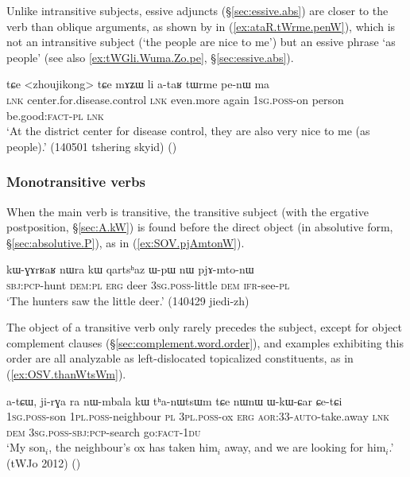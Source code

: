 Unlike intransitive subjects, essive adjuncts (§\ref{sec:essive.abs}) are closer to the verb than oblique arguments, as shown by  in (\ref{ex:ataR.tWrme.penW}), which is not an intransitive subject (`the people are nice to me') but an essive phrase `as people' (see also \ref{ex:tWGli.Wuma.Zo.pe}, §\ref{sec:essive.abs}).

\begin{exe}
\ex \label{ex:ataR.tWrme.penW}
\gll tɕe <zhoujikong> tɕe mɤʑɯ li a-taʁ tɯrme pe-nɯ ma \\
\textsc{lnk} center.for.disease.control \textsc{lnk} even.more again \textsc{1sg}.\textsc{poss}-on person be.good:\textsc{fact}-\textsc{pl} \textsc{lnk} \\
\glt `At the district center for disease control, they are also very nice to me (as people).' (140501 tshering skyid)
()
\end{exe}

 
\subsubsection{Monotransitive verbs} \label{sec:monotransitive.word.order}
When the main verb is transitive, the transitive subject (with the ergative postposition, §\ref{sec:A.kW}) is found before the direct object (in absolutive form, §\ref{sec:absolutive.P}), as in (\ref{ex:SOV.pjAmtonW}). 

\begin{exe}
\ex \label{ex:SOV.pjAmtonW}
\gll kɯ-ɣɤrʁaʁ nɯra kɯ qartsʰaz ɯ-pɯ nɯ pjɤ-mto-nɯ \\
\textsc{sbj}:\textsc{pcp}-hunt \textsc{dem}:\textsc{pl} \textsc{erg} deer \textsc{3sg}.\textsc{poss}-little \textsc{dem} \textsc{ifr}-see-\textsc{pl} \\
\glt `The hunters saw the little deer.' (140429 jiedi-zh)
\end{exe}

The object of a transitive verb only rarely precedes the subject, except for object complement clauses (§\ref{sec:complement.word.order}), and examples exhibiting this order are all analyzable as left-dislocated topicalized constituents, as in (\ref{ex:OSV.thanWtsWm}).

\begin{exe}
\ex \label{ex:OSV.thanWtsWm}
\gll a-tɕɯ, ji-rɣa ra nɯ-mbala kɯ tʰa-nɯtsɯm tɕe nɯnɯ ɯ-kɯ-ɕar ɕe-tɕi \\
\textsc{1sg}.\textsc{poss}-son \textsc{1pl}.\textsc{poss}-neighbour \textsc{pl} \textsc{3pl}.\textsc{poss}-ox \textsc{erg} \textsc{aor}:3\fl{}3-\textsc{auto}-take.away \textsc{lnk} \textsc{dem} \textsc{3sg}.\textsc{poss}-\textsc{sbj}:\textsc{pcp}-search go:\textsc{fact}-\textsc{1du} \\
\glt `My son$_i$, the neighbour's ox has taken him$_i$ away, and we are looking for him$_i$.' (tWJo 2012)
()
\end{exe}

